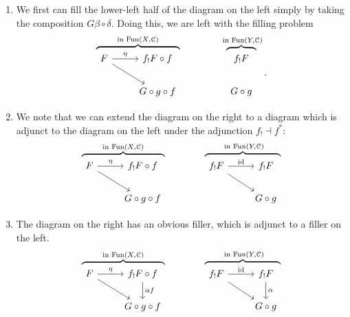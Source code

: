 \documentclass[main.tex]{subfiles}
\begin{document}
\begin{enumerate}
  \item We first can fill the lower-left half of the diagram on the left simply by taking the composition $G\beta \circ \delta$. Doing this, we are left with the filling problem
    \begin{equation*}
      \overbrace{
      \begin{tikzcd}[ampersand replacement=\&]
        F
        \arrow[r, "\eta"]
        \arrow[dr]
        \& f_{!}F \circ f
        \\
        \& G \circ g \circ f
      \end{tikzcd}}^{\text{in }\Fun(X, \category{C})}
      \qquad\qquad
      \overbrace{
      \begin{tikzcd}
        f_{!}F
        \\
        G \circ g
      \end{tikzcd}}^{\text{ in }\Fun(Y, \category{C})}.
    \end{equation*}

  \item We note that we can extend the diagram on the right to a diagram which is adjunct to the diagram on the left under the adjunction $f_{!} \dashv f^{*}$:
    \begin{equation*}
      \overbrace{
      \begin{tikzcd}[ampersand replacement=\&]
        F
        \arrow[r, "\eta"]
        \arrow[dr]
        \& f_{!}F \circ f
        \\
        \& G \circ g \circ f
      \end{tikzcd}}^{\text{in }\Fun(X, \category{C})}
      \qquad\qquad
      \overbrace{
        \begin{tikzcd}[ampersand replacement=\&]
          f_{!}F
          \arrow[r, "\id"]
          \arrow[dr]
        \& f_{!}F
        \\
        \& G \circ g
      \end{tikzcd}}^{\text{ in }\Fun(Y, \category{C})}
    \end{equation*}

  \item The diagram on the right has an obvious filler, which is adjunct to a filler on the left.
    \begin{equation*}
      \overbrace{
      \begin{tikzcd}[ampersand replacement=\&]
        F
        \arrow[r, "\eta"]
        \arrow[dr]
        \& f_{!}F \circ f
        \arrow[d, "\alpha f"]
        \\
        \& G \circ g \circ f
      \end{tikzcd}}^{\text{in }\Fun(X, \category{C})}
      \qquad\qquad
      \overbrace{
        \begin{tikzcd}[ampersand replacement=\&]
          f_{!}F
          \arrow[r, "\id"]
          \arrow[dr]
        \& f_{!}F
        \arrow[d, "\alpha"]
        \\
        \& G \circ g
      \end{tikzcd}}^{\text{ in }\Fun(Y, \category{C})}
    \end{equation*}
\end{enumerate}
\end{document}
